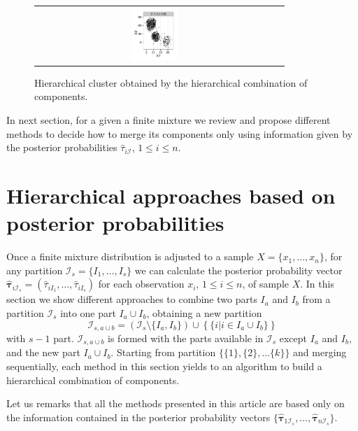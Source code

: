 \documentclass[10pt, a4paper]{article}
\newcommand{\m}[1]{\boldsymbol{#1}}
\begin{document}
\begin{figure}[thbp]
\begin{center}
\begin{tabular}{cc}
            \includegraphics[trim=0cm 0cm 0cm 0cm,width=0.2\textwidth]{partition-example-part1.pdf}
 \end{tabular}
 \caption{Hierarchical cluster obtained by the hierarchical combination of components.}\label{hierarchical}
\end{center}
\end{figure}

In next section, for a given a finite mixture we review and propose different methods to decide how to merge its components only using information given by the posterior probabilities $\hat{\tau}_{i \mathcal{I}}$, $1\leq i \leq n$.

\section{Hierarchical approaches based on posterior probabilities}
\label{old_methods}

Once a finite mixture distribution is adjusted to a sample $X=\{x_1, \dots, x_n\}$, for any partition $\mathcal{I}_s = \{ I_1, \dots, I_s\}$ we can calculate the posterior probability vector  $\hat{\m\tau}_{i \mathcal{I}_s} = \left( \hat{\tau}_{i I_1} , \dots, \hat{\tau}_{i I_s}  \right)$ for each observation $x_i$, $1 \leq i \leq n$, of sample $X$. In this section we show different approaches to combine two parts $I_a$ and $I_b$ from a partition $\mathcal{I}_s$ into one part $I_a \cup I_b$, obtaining a new partition
\[
\mathcal{I}_{s, a \cup b} = \left( \mathcal{I}_s \setminus \{ I_a, I_b \} \right) \cup \left\{ \{ i | i \in I_a\cup I_b \} \right\}
\]
with $s-1$ part. $\mathcal{I}_{s, a \cup b}$ is formed with the parts available in $\mathcal{I}_{s}$ except $I_a$ and  $I_b$, and the new part $I_a \cup I_b$. Starting from partition $\{ \{1\}, \{2\}, \dots \{k\}\}$ and merging sequentially, each method in this section yields to an algorithm to build a hierarchical combination of components.

Let us remarks that all the methods presented in this article are based only on the information contained in the posterior probability vectors $\{ \hat{\m\tau}_{1 \mathcal{I}_s},\dots, \hat{\m\tau}_{n \mathcal{I}_s} \}$.
\end{document}
